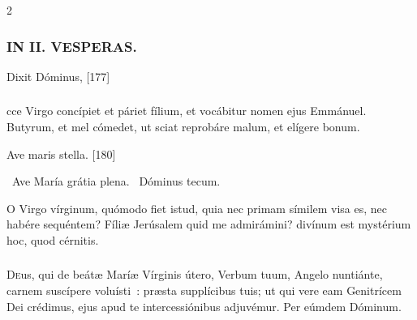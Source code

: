 \documentclass[9pt,twoside]{extarticle}
\begin{document}
\begin{multicols}{2}
\subsubsection*{\center \textsc{IN II. VESPERAS.}}
\begin{tightlist}{}
\item {}
\item {} Dixit Dóminus,  [177]
\end{tightlist}

\subsubsection*{}
cce Virgo concípiet et páriet fílium, et vocábitur nomen ejus Emmánuel. Butyrum, et mel cómedet, ut sciat reprobáre malum, et elígere bonum.

\begin{tightlist}{}
\item {} Ave maris stella. [180]
\item {}~Ave María grátia plena. ~Dóminus tecum.

\item {} O Virgo vírginum, quómodo fiet istud, quia nec primam símilem visa es, nec habére sequéntem? Fíliæ Jerúsalem quid me admirámini? divínum est mystérium hoc, quod cérnitis.
\end{tightlist}

\subsubsection*{\center {}}
\lettrine{D}eus, qui de beátæ Maríæ Vírginis útero, Verbum tuum, Angelo nuntiánte, carnem suscípere voluísti~: præsta supplícibus tuis; ut qui vere eam Genitrícem Dei crédimus, ejus apud te intercessiónibus adjuvémur. Per eúmdem Dóminum.


\end{multicols}
\end{document}
